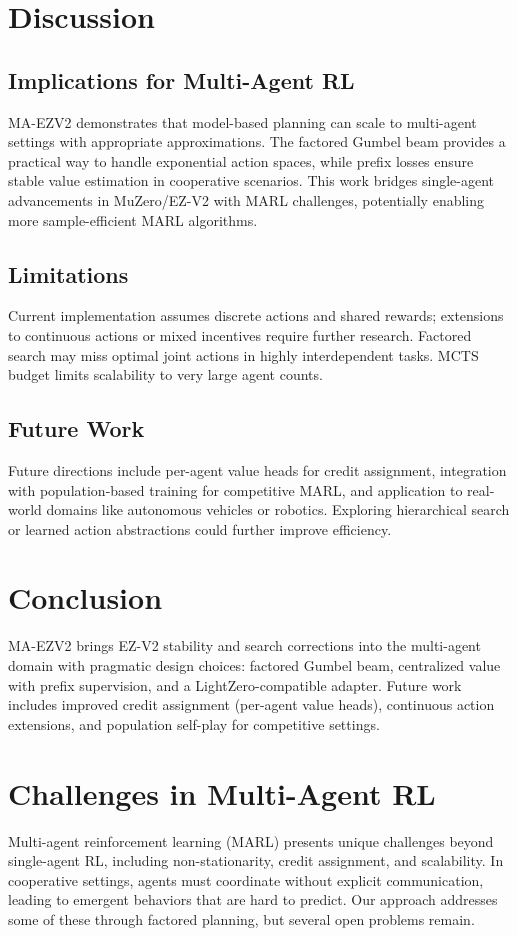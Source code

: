 \documentclass{article}
\begin{document}
\section{Discussion}
\subsection{Implications for Multi-Agent RL}
MA-EZV2 demonstrates that model-based planning can scale to multi-agent settings with appropriate approximations. The factored Gumbel beam provides a practical way to handle exponential action spaces, while prefix losses ensure stable value estimation in cooperative scenarios. This work bridges single-agent advancements in MuZero/EZ-V2 with MARL challenges, potentially enabling more sample-efficient MARL algorithms.

\subsection{Limitations}
Current implementation assumes discrete actions and shared rewards; extensions to continuous actions or mixed incentives require further research. Factored search may miss optimal joint actions in highly interdependent tasks. MCTS budget limits scalability to very large agent counts.

\subsection{Future Work}
Future directions include per-agent value heads for credit assignment, integration with population-based training for competitive MARL, and application to real-world domains like autonomous vehicles or robotics. Exploring hierarchical search or learned action abstractions could further improve efficiency.

\section{Conclusion}
MA-EZV2 brings EZ-V2 stability and search corrections into the multi-agent domain with pragmatic design choices: factored Gumbel beam, centralized value with prefix supervision, and a LightZero-compatible adapter. Future work includes improved credit assignment (per-agent value heads), continuous action extensions, and population self-play for competitive settings.

\section{Challenges in Multi-Agent RL}
Multi-agent reinforcement learning (MARL) presents unique challenges beyond single-agent RL, including non-stationarity, credit assignment, and scalability. In cooperative settings, agents must coordinate without explicit communication, leading to emergent behaviors that are hard to predict. Our approach addresses some of these through factored planning, but several open problems remain.
\end{document}
